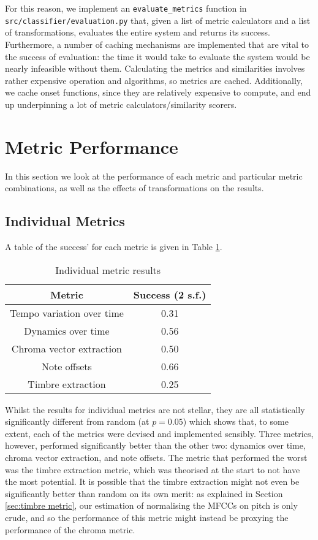 \documentclass[oneside, class=book, 12pt, crop=false]{standalone}
\begin{document}
For this reason, we implement an \texttt{evaluate\_metrics} function in \texttt{src/classifier/evaluation.py} that, given a list of metric calculators and a list of transformations, evaluates the entire system and returns its success. Furthermore, a number of caching mechanisms are implemented that are vital to the success of evaluation: the time it would take to evaluate the system would be nearly infeasible without them. Calculating the metrics and similarities involves rather expensive operation and algorithms, so metrics are cached. Additionally, we cache onset functions, since they are relatively expensive to compute, and end up underpinning a lot of metric calculators/similarity scorers.

\section{Metric Performance}

In this section we look at the performance of each metric and particular metric combinations, as well as the effects of transformations on the results.

\subsection{Individual Metrics}

A table of the success' for each metric is given in Table \ref{table:metric results}. 

\begin{table}[h]
    \centering
    \begin{tabular}{cc}
        \textbf{Metric}&\textbf{Success} (2 s.f.) \\
        \midrule[0.15em]
        Tempo variation over time&0.31 \\
        Dynamics over time&0.56 \\
         Chroma vector extraction&0.50 \\
         Note offsets&0.66 \\
         Timbre extraction&0.25\\
    \end{tabular}
    \caption{Individual metric results}
    \label{table:metric results}
\end{table}

Whilst the results for individual metrics are not stellar, they are all statistically significantly different from random (at $p=0.05$) which shows that, to some extent, each of the metrics were devised and implemented sensibly. Three metrics, however, performed significantly better than the other two: dynamics over time, chroma vector extraction, and note offsets. The metric that performed the worst was the timbre extraction metric, which was theorised at the start to not have the most potential. It is possible that the timbre extraction might not even be significantly better than random on its own merit: as explained in Section \ref{sec:timbre metric}, our estimation of normalising the MFCCs on pitch is only crude, and so the performance of this metric might instead be proxying the performance of the chroma metric.
\end{document}
